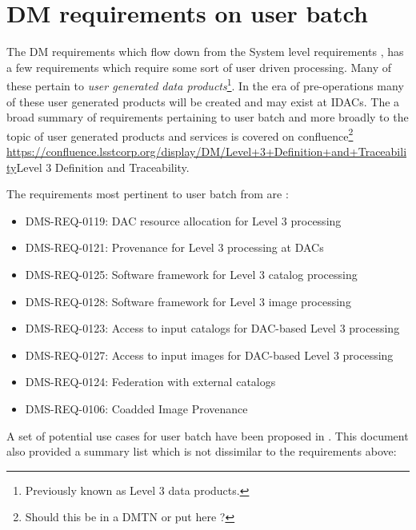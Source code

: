 \section{DM requirements on user batch} \label{sec:requirements}

The DM requirements  which flow down from the System level requirements ,
has  a few requirements which require some sort of user driven processing.
Many of these pertain to {\em user generated data products}\footnote{Previously known as Level 3 data products.}.
In the era of pre-operations many of these user generated products will be created and may exist at IDACs.
The a broad summary of requirements pertaining to user batch and more broadly to the topic of user generated products and services is covered on confluence\footnote{Should this be in a DMTN or put here ?} \url{https://confluence.lsstcorp.org/display/DM/Level+3+Definition+and+Traceability}{Level 3 Definition and Traceability}.

The requirements most pertinent to user batch from  are :

\begin{itemize}
\item DMS-REQ-0119: DAC resource allocation for Level 3 processing
\item DMS-REQ-0121: Provenance for Level 3 processing at DACs
\item DMS-REQ-0125: Software framework for Level 3 catalog processing
\item DMS-REQ-0128: Software framework for Level 3 image processing
\item DMS-REQ-0123: Access to input catalogs for DAC-based Level 3 processing
\item DMS-REQ-0127: Access to input images for DAC-based Level 3 processing
\item DMS-REQ-0124: Federation with external catalogs
\item DMS-REQ-0106: Coadded Image Provenance
\end{itemize}


A set of potential use cases for user batch have been proposed in .
This document also provided a summary list which is not dissimilar to the requirements above:

